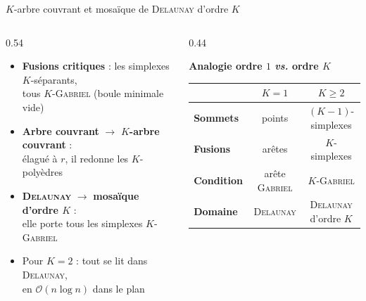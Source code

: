 \begin{frame}{$K$-arbre couvrant et mosaïque de \textsc{Delaunay} d'ordre $K$}
    \begin{columns}[c, onlytextwidth]
        \begin{column}{0.54\textwidth}
            \begin{itemize}
                \setlength{\itemsep}{10pt}
                \item \textbf{Fusions critiques} : les simplexes $K$-séparants,\\
                tous $K$-\textsc{Gabriel} (boule minimale vide)
                \item \textbf{Arbre couvrant} $\longrightarrow$ \textbf{$K$-arbre couvrant} :\\
                élagué à $r$, il redonne les $K$-polyèdres 
                \item \textbf{\textsc{Delaunay}} $\longrightarrow$ \textbf{mosaïque d'ordre $K$} :\\
                elle porte tous les simplexes $K$-\textsc{Gabriel} 
                \item Pour $K=2$ : tout se lit dans \textsc{Delaunay},\\
                en $\mathcal O(n\log n)$ dans le plan
            \end{itemize}
        \end{column}

        \begin{column}{0.44\textwidth}
            \begin{center}
                \textbf{Analogie ordre $1$ \emph{vs.} ordre $K$}

                \vspace{0.4cm}
                \small
                \renewcommand{\arraystretch}{1.5}
                \setlength{\tabcolsep}{3pt}
                \begin{tabular}{lcc}
                    \toprule
                    & \textbf{$K = 1$} & \textbf{$K \ge 2$} \\
                    \midrule
                    \textbf{Sommets} & points & $(K-1)$-simplexes \\
                    \textbf{Fusions} & arêtes & $K$-simplexes \\
                    \textbf{Condition} & arête \textsc{Gabriel} & $K$-\textsc{Gabriel} \\
                    \textbf{Domaine} & \textsc{Delaunay} & \textsc{Delaunay} d'ordre $K$ \\
                    \bottomrule
                \end{tabular}
            \end{center}
        \end{column}
    \end{columns}
\end{frame}

